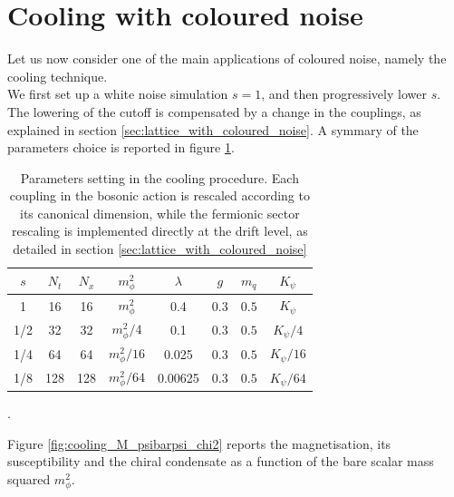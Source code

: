 \section{Cooling with coloured noise}
Let us now consider one of the main applications of coloured noise, namely the cooling technique. \\
We first set up a white noise simulation $s=1$, and then progressively lower $s$. The lowering of the cutoff is compensated by a change in the couplings, as explained in section  \ref{sec:lattice_with_coloured_noise}. A symmary of the parameters choice is reported in figure  \ref{tab:params_cooling}. \\
\begin{table}[htp]
    \centering
    \begin{tabular}{cccccccc}
        \toprule
        $s$ & $N_t$ & $N_x$ & $m_\phi^2$ & $\lambda$ & $g$ & $m_q$& $K_\psi$ \\
        \midrule 
        1 & 16 & 16 & $m_\phi^2$ & 0.4 & 0.3 & $0.5$ & $K_\psi$ \\
        1/2 & 32 & 32 & $m_\phi^2/4$ & 0.1 & 0.3 & $0.5$ & $K_\psi/4$ \\
        1/4 & 64 & 64 & $m_\phi^2/16$ & 0.025 & 0.3 & $0.5$ & $K_\psi/16$ \\
        1/8 & 128 & 128 & $m_\phi^2/64$ & 0.00625 & 0.3 & $0.5$ & $K_\psi/64$ \\
        \bottomrule
    \end{tabular}
    \caption[Parameters cooling]{Parameters setting in the cooling procedure. Each coupling in the bosonic action is rescaled according to its canonical dimension, while the fermionic sector rescaling is implemented directly at the drift level, as detailed in section \ref{sec:lattice_with_coloured_noise}}.
    \label{tab:params_cooling}
\end{table}
Figure \ref{fig:cooling_M_psibarpsi_chi2} reports the magnetisation, its susceptibility and the chiral condensate as a function of the bare scalar mass squared $m_\phi^2$.
